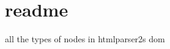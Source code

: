 \chapter{readme}
\hypertarget{md_pkiclassroomrescheduler_2src_2main_2frontend_2node__modules_2svgo_2node__modules_2domelementtype_2readme}{}\label{md_pkiclassroomrescheduler_2src_2main_2frontend_2node__modules_2svgo_2node__modules_2domelementtype_2readme}
all the types of nodes in htmlparser2\textquotesingle{}s dom 